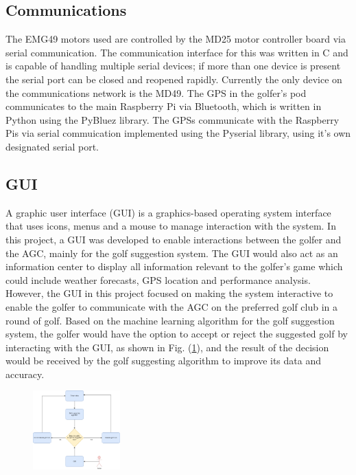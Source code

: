 \documentclass[11pt,landscape]{article}
\begin{document}
\begin{multicols}{3}

\subsection{Communications}
The EMG49 motors used are controlled by the MD25 motor controller board
via serial communication. The communication interface for this was written
in C and is capable of handling multiple serial devices; if more than one device
is present the serial port can be closed and reopened rapidly. Currently the
only device on the communications network is the MD49. The GPS in the
golfer's pod communicates to the main Raspberry Pi via Bluetooth, which is
written in Python using the PyBluez library. The GPSs communicate with the
Raspberry Pis via serial commuication implemented using the Pyserial library,
using it's own designated serial port.


\subsection{GUI}

A graphic user interface (GUI) is a graphics-based operating system interface
that uses icons, menus and a mouse to manage interaction with the system. In
this project, a GUI was developed to enable interactions between the golfer and
the AGC, mainly for the golf suggestion system. The GUI would also act as an
information center to display all information relevant to the golfer’s
game which could include weather forecasts, GPS location and performance
analysis. However, the GUI in this project focused on making the system
interactive to enable the golfer to communicate with the AGC on the preferred
golf club in a round of golf. Based on the machine learning algorithm for the
golf suggestion system, the golfer would have the option to accept or reject the
suggested golf by interacting with the GUI, as shown in Fig. (\ref{fig:gui}),
and the result of the decision would be received by the golf suggesting
algorithm to improve its data and accuracy. 

\begin{figure}[H]
    \begin{center}
        \includegraphics[width=0.3\textwidth]{GUI.png}
    \end{center}
    \label{fig:gui}
\end{figure}


\end{multicols}
\end{document}
